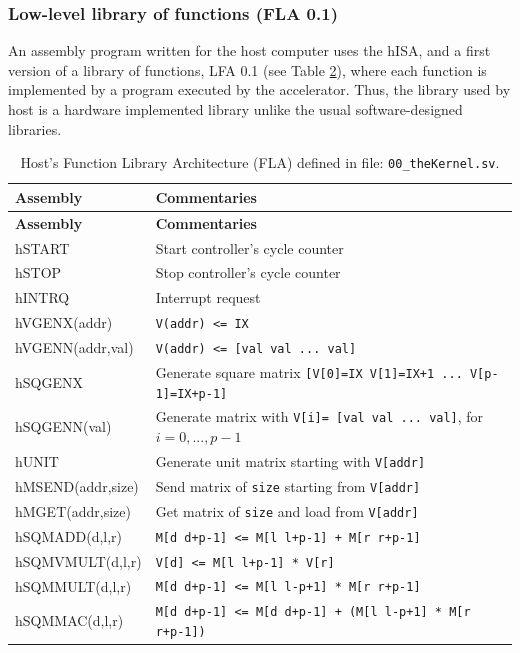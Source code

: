 \subsubsection{Low-level library of functions (FLA 0.1)}

An assembly program written for the host computer uses the hISA, and a first version of a  library of functions, LFA 0.1 (see Table \ref{tab:lfa01}), where each function is implemented by a program executed by the accelerator. Thus, the library used by host is a hardware implemented library unlike the usual software-designed libraries.

\begin{table}[H]
\small
\centering
\begin{longtable}{|l|l|}
\caption{Host's Function Library Architecture (FLA) defined in file: {\tt 00\_theKernel.sv}.}
\label{tab:lfa01} \\
\hline
\textbf{Assembly} & \textbf{Commentaries} \\
\hline
\endfirsthead
\hline
\textbf{Assembly} & \textbf{Commentaries} \\
\hline
\endhead
\hline
\endfoot
\hline
\endlastfoot
hSTART           & Start controller's cycle counter \\ \hline
hSTOP            & Stop controller's cycle counter \\ \hline
hINTRQ           & Interrupt request \\ \hline
hVGENX(addr)     & \texttt{V(addr) <= IX} \\ \hline
hVGENN(addr,val) & \texttt{V(addr) <= [val val ... val]} \\ \hline
hSQGENX          & Generate square matrix \texttt{[V[0]=IX V[1]=IX+1 ... V[p-1]=IX+p-1]} \\ \hline
hSQGENN(val)     & Generate matrix with \texttt{V[i]= [val val ... val]}, for \(i = 0, ..., p-1\) \\ \hline
hUNIT            & Generate unit matrix starting with \texttt{V[addr]} \\ \hline
hMSEND(addr,size)& Send matrix of \texttt{size} starting from \texttt{V[addr]} \\ \hline
hMGET(addr,size) & Get matrix of \texttt{size} and load from \texttt{V[addr]} \\ \hline
hSQMADD(d,l,r)   & \texttt{M[d d+p-1] <= M[l l+p-1] + M[r r+p-1]} \\ \hline
hSQMVMULT(d,l,r) & \texttt{V[d] <= M[l l+p-1] * V[r]} \\ \hline
hSQMMULT(d,l,r)  & \texttt{M[d d+p-1] <= M[l l-p+1] * M[r r+p-1]} \\ \hline
hSQMMAC(d,l,r)   & \texttt{M[d d+p-1] <= M[d d+p-1] + (M[l l-p+1] * M[r r+p-1])} \\ \hline
\end{longtable}
\end{table}


